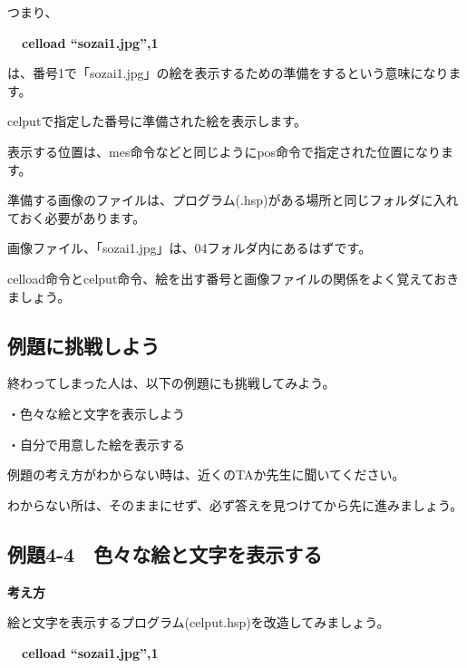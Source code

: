 \documentclass[a4paper,12pt]{jarticle}
\begin{document}
\bigskip
\bigskip
\bigskip

つまり、

\bigskip

{\bfseries
\ \ celload “sozai1.jpg”,1}

\bigskip

は、番号1で「sozai1.jpg」の絵を表示するための準備をするという意味になります。

celputで指定した番号に準備された絵を表示します。

表示する位置は、mes命令などと同じようにpos命令で指定された位置になります。

準備する画像のファイルは、プログラム(.hsp)がある場所と同じフォルダに入れておく必要があります。

画像ファイル、「sozai1.jpg」は、04フォルダ内にあるはずです。


\bigskip

celload命令とcelput命令、絵を出す番号と画像ファイルの関係をよく覚えておきましょう。

\bigskip
\bigskip
\bigskip

\subsection{例題に挑戦しよう}

\bigskip
\bigskip

終わってしまった人は、以下の例題にも挑戦してみよう。

\bigskip

・色々な絵と文字を表示しよう

・自分で用意した絵を表示する


\bigskip

例題の考え方がわからない時は、近くのTAか先生に聞いてください。

わからない所は、そのままにせず、必ず答えを見つけてから先に進みましょう。

\clearpage
\subsection{例題4-4　色々な絵と文字を表示する}
\bigskip
\bigskip

{\bfseries
考え方}

\bigskip

絵と文字を表示するプログラム(celput.hsp)を改造してみましょう。


\bigskip

{\bfseries
\ \ celload “sozai1.jpg”,1}


\bigskip
\end{document}
